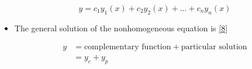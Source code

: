 \documentclass[12pt]{article}
\begin{document}
\begin{itemize}
    \begin{equation}
      y=c_1y_1(x)+c_2y_2(x)+\dots+c_ny_n(x)
      \label{7}
    \end{equation}

  \item The general solution of the nonhomogeneous equation is \eqref{8}

    \begin{equation}
      \begin{split}
        y & = \text{complementary function} + \text{particular solution}\\
        & = y_c+y_p\\
      \end{split}
      \label{8}
    \end{equation}

\end{itemize}
\end{document}

